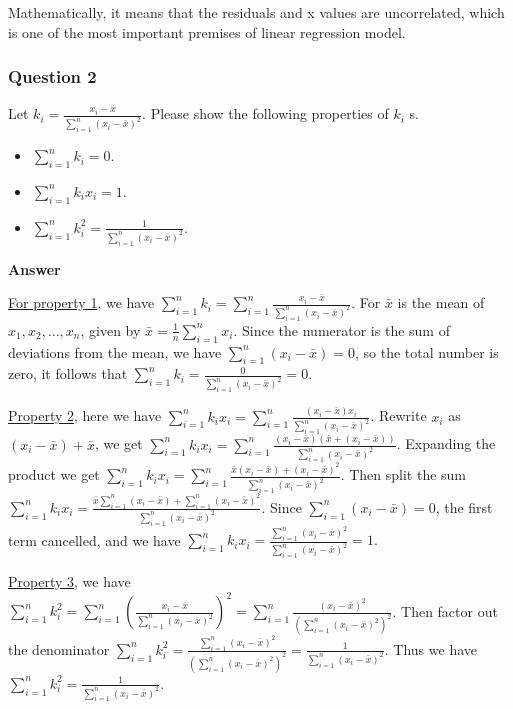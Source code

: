 \documentclass[margin=1in]{article}
\begin{document}
	  Mathematically, it means that the residuals and x values are uncorrelated, which is one of the most important premises of linear regression model.
		
		\pagebreak
		\subsubsection*{Question 2}
		Let $k_i=\frac{x_i-\bar{x}}{\sum_{i=1}^n\left(x_i-\bar{x}\right)^2}$. Please show the following properties of $k_i$ s.
		
		\begin{itemize}
		\item$\sum_{i=1}^n k_i=0$.
		\item $\sum_{i=1}^n k_i x_i=1$.
		\item $\sum_{i=1}^n k_i^2=\frac{1}{\sum_{i=1}^n\left(x_i-\bar{x}\right)^2}$.
    	\end{itemize}
    
    \textbf{Answer}
    
    
    
    \underline{For property 1}, we have $ \sum_{i=1}^n k_i = \sum_{i=1}^n \frac{x_i - \bar{x}}{\sum_{i=1}^n (x_i - \bar{x})^2}$. For  \( \bar{x} \) is the mean of \( x_1, x_2, \dots, x_n \), given by $  \bar{x} = \frac{1}{n} \sum_{i=1}^n x_i$. Since the numerator is the sum of deviations from the mean, we have $  \sum_{i=1}^n (x_i - \bar{x}) = 0$, so the total number is zero, it follows that $ \sum_{i=1}^n k_i = \frac{0}{\sum_{i=1}^n (x_i - \bar{x})^2} = 0$.
    
    \underline{Property 2}, here we have $\sum_{i=1}^n k_i x_i = \sum_{i=1}^n \frac{(x_i - \bar{x}) x_i}{\sum_{i=1}^n (x_i - \bar{x})^2}$. Rewrite \( x_i \) as \( (x_i - \bar{x}) + \bar{x} \), we get $\sum_{i=1}^n k_i x_i = \sum_{i=1}^n \frac{(x_i - \bar{x}) (\bar{x} + (x_i - \bar{x}))}{\sum_{i=1}^n (x_i - \bar{x})^2}$. Expanding the product we get $\sum_{i=1}^n k_i x_i = \sum_{i=1}^n \frac{\bar{x} (x_i - \bar{x}) + (x_i - \bar{x})^2}{\sum_{i=1}^n (x_i - \bar{x})^2}$. Then split the sum $\sum_{i=1}^n k_i x_i = \frac{\bar{x} \sum_{i=1}^n (x_i - \bar{x}) + \sum_{i=1}^n (x_i - \bar{x})^2}{\sum_{i=1}^n (x_i - \bar{x})^2}$. Since \( \sum_{i=1}^n (x_i - \bar{x}) = 0 \), the first term cancelled, and we have $
    \sum_{i=1}^n k_i x_i = \frac{\sum_{i=1}^n (x_i - \bar{x})^2}{\sum_{i=1}^n (x_i - \bar{x})^2} = 1.$ 
    
    \underline{Property 3}, we have $
    \sum_{i=1}^n k_i^2 = \sum_{i=1}^n \left( \frac{x_i - \bar{x}}{\sum_{i=1}^n (x_i - \bar{x})^2} \right)^2
    = \sum_{i=1}^n \frac{(x_i - \bar{x})^2}{\left(\sum_{i=1}^n (x_i - \bar{x})^2\right)^2}$. Then factor out the denominator $
    \sum_{i=1}^n k_i^2 = \frac{\sum_{i=1}^n (x_i - \bar{x})^2}{\left(\sum_{i=1}^n (x_i - \bar{x})^2\right)^2}
    = \frac{1}{\sum_{i=1}^n (x_i - \bar{x})^2}$. Thus we have  \( \sum_{i=1}^n k_i^2 = \frac{1}{\sum_{i=1}^n (x_i - \bar{x})^2} \).
		
\end{document}
